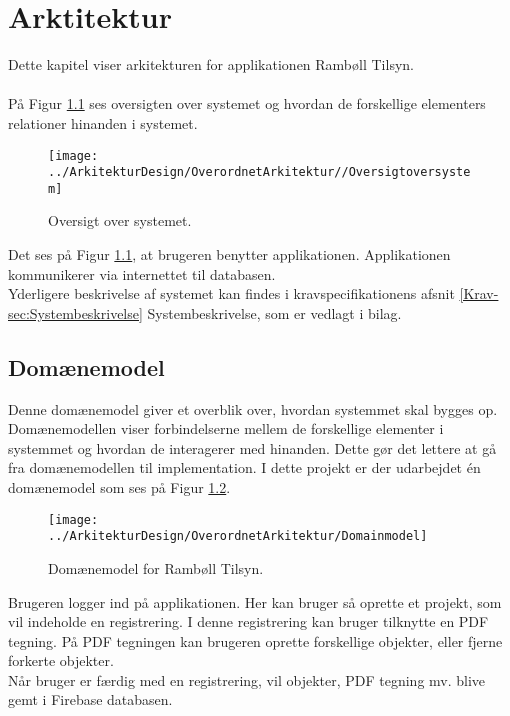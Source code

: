 \chapter{Arktitektur}
Dette kapitel viser arkitekturen for applikationen Rambøll Tilsyn.\label{sec:Arkitektur} \\ \\ 
På Figur \ref{fig:OversigtSystembeskrivelse} ses oversigten over systemet og hvordan de forskellige elementers relationer hinanden i systemet.
\begin{figure}[H] %
	\centering
	\texttt{[image: ../ArkitekturDesign/OverordnetArkitektur//Oversigtoversystem]}
	\caption{Oversigt over systemet.}
	\label{fig:OversigtSystembeskrivelse}
\end{figure}
Det ses på Figur \ref{fig:OversigtSystembeskrivelse}, at brugeren benytter applikationen. Applikationen kommunikerer via internettet til databasen. \\
Yderligere beskrivelse af systemet kan findes i kravspecifikationens afsnit \ref{Krav-sec:Systembeskrivelse} Systembeskrivelse, som er vedlagt i bilag.

\clearpage

\section{Domænemodel}
Denne domænemodel giver et overblik over, hvordan systemmet skal bygges op. Domænemodellen viser forbindelserne mellem de forskellige elementer i systemmet og hvordan de interagerer med hinanden. Dette gør det lettere at gå fra domænemodellen til implementation.
I dette projekt er der udarbejdet én domænemodel som ses på Figur \ref{fig:Domain}.

\begin{figure}[H] %
	\centering
	\texttt{[image: ../ArkitekturDesign/OverordnetArkitektur/Domainmodel]}
	\caption{Domænemodel for Rambøll Tilsyn.}
	\label{fig:Domain}
\end{figure}
Brugeren logger ind på applikationen. Her kan bruger så oprette et projekt, som vil indeholde en registrering. I denne registrering kan bruger tilknytte en PDF tegning. På PDF tegningen kan brugeren oprette forskellige objekter, eller fjerne forkerte objekter. \\
Når bruger er færdig med en registrering, vil objekter, PDF tegning mv. blive gemt i Firebase databasen.

\clearpage